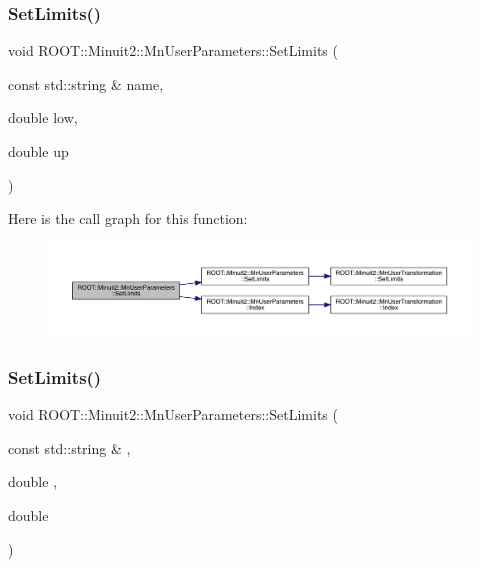 \subsubsection{\texorpdfstring{SetLimits()}{SetLimits()}\hspace{0.1cm}{\footnotesize\ttfamily [3/4]}}
{\footnotesize\ttfamily void R\+O\+O\+T\+::\+Minuit2\+::\+Mn\+User\+Parameters\+::\+Set\+Limits (\begin{DoxyParamCaption}\item[{const std\+::string \&}]{name,  }\item[{double}]{low,  }\item[{double}]{up }\end{DoxyParamCaption})}

Here is the call graph for this function\+:\nopagebreak
\begin{figure}[H]
\begin{center}
\leavevmode
\includegraphics[width=350pt]{d6/d10/classROOT_1_1Minuit2_1_1MnUserParameters_a3b22d430f97df8789a8890497c57eed4_cgraph}
\end{center}
\end{figure}
\mbox{\label{classROOT_1_1Minuit2_1_1MnUserParameters_a3b22d430f97df8789a8890497c57eed4}} 
\subsubsection{\texorpdfstring{SetLimits()}{SetLimits()}\hspace{0.1cm}{\footnotesize\ttfamily [4/4]}}
{\footnotesize\ttfamily void R\+O\+O\+T\+::\+Minuit2\+::\+Mn\+User\+Parameters\+::\+Set\+Limits (\begin{DoxyParamCaption}\item[{const std\+::string \&}]{,  }\item[{double}]{,  }\item[{double}]{ }\end{DoxyParamCaption})}

